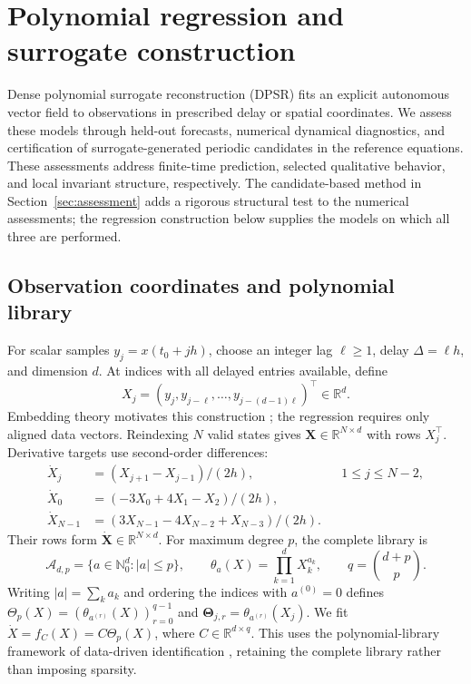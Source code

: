 \documentclass[11pt]{article}
\newcommand{\R}{\mathbb{R}}
\newcommand{\Nzero}{\mathbb{N}_0}
\newcommand{\Xdot}{\dot{\mathbf X}}
\begin{document}
\section{Polynomial regression and surrogate construction}
\label{sec:regression}
Dense polynomial surrogate reconstruction (DPSR) fits an explicit autonomous
vector field to observations in prescribed delay or spatial coordinates.
We assess these models through held-out forecasts, numerical dynamical
diagnostics, and certification of surrogate-generated periodic candidates in
the reference equations. These assessments address finite-time prediction,
selected qualitative behavior, and local invariant structure, respectively.
The candidate-based method in Section~\ref{sec:assessment} adds a rigorous
structural test to the numerical assessments; the regression construction
below supplies the models on which all three are performed.

\subsection{Observation coordinates and polynomial library}
\label{sec:delay-coordinates}
For scalar samples $y_j=x(t_0+jh)$, choose an integer lag $\ell\geq1$, delay $\Delta=\ell h$, and dimension $d$. At indices with all delayed entries available, define
\begin{equation}
 X_j=(y_j,y_{j-\ell},\ldots,y_{j-(d-1)\ell})^\top\in\R^d.
 \label{eq:sampled-delay-state}
\end{equation}
Embedding theory motivates this construction \cite{takens1981,sauer1991}; the regression requires only aligned data vectors. Reindexing $N$ valid states gives $\mathbf X\in\R^{N\times d}$ with rows $X_j^\top$. Derivative targets use second-order differences:
\begin{equation}
 \begin{aligned}
 \dot X_j&=(X_{j+1}-X_{j-1})/(2h),&&1\leq j\leq N-2,\\
 \dot X_0&=(-3X_0+4X_1-X_2)/(2h),\\
 \dot X_{N-1}&=(3X_{N-1}-4X_{N-2}+X_{N-3})/(2h).
 \end{aligned}
 \label{eq:derivatives}
\end{equation}
Their rows form $\Xdot\in\R^{N\times d}$. For maximum degree $p$, the complete library is
\begin{equation}
 \mathcal A_{d,p}=\{a\in\Nzero^d:|a|\leq p\},\qquad
 \theta_a(X)=\prod_{k=1}^{d}X_k^{a_k},\qquad q=\binom{d+p}{p}.
 \label{eq:polynomial-library}
\end{equation}
Writing $|a|=\sum_k a_k$ and ordering the indices with $a^{(0)}=0$ defines
$\Theta_p(X)=(\theta_{a^{(r)}}(X))_{r=0}^{q-1}$ and
$\mathbf\Theta_{j,r}=\theta_{a^{(r)}}(X_j)$. We fit
$\dot X=f_C(X)=C\Theta_p(X)$, where $C\in\R^{d\times q}$.
This uses the polynomial-library framework of data-driven identification
\cite{brunton2016}, retaining the complete library rather than imposing sparsity.
\end{document}
